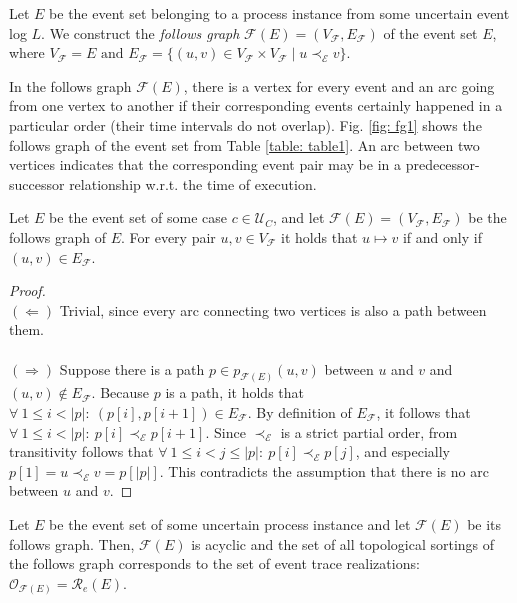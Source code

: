 \begin{definition}\label{def: follows graph}
Let $E$ be the event set belonging to a process instance from some uncertain event log $L$.
We construct the \emph{follows graph} $\mathcal{F}(E)=(V_{\mathcal{F}},E_{\mathcal{F}})$ of the event set $E$, where 
$V_{\mathcal{F}} = E \text{ and }
E_{\mathcal{F}} = \{(u,v) \in V_{\mathcal{F}} \times V_{\mathcal{F}} \mid 
u \prec_{\mathcal{E}} v \}.$
\end{definition}

In the follows graph $\mathcal{F}(E)$, there is a vertex for every event and an arc going from one vertex to another if their corresponding events certainly happened in a particular order (their time intervals do not overlap).
Fig. \ref{fig: fg1} shows the follows graph of the event set from Table \ref{table: table1}.
An arc between two vertices indicates that the corresponding event pair may be in a predecessor-successor relationship w.r.t. the time of execution.

\begin{lemma}\label{lemma: edge path}
Let $E$ be the event set of some case $c \in \mathcal{U}_C$, and let $\mathcal{F}(E)=(V_{\mathcal{F}},E_{\mathcal{F}})$ be the follows graph of $E$.
For every pair $u,v \in V_{\mathcal{F}}$ it holds that $u \mapsto v$ if and only if $(u,v) \in E_{\mathcal{F}}$.
\end{lemma}

\begin{proof} 
\leavevmode \\ 
$(\Leftarrow)$ Trivial, since every arc connecting two vertices is also a path between them. \\ \\
$(\Rightarrow)$ Suppose there is a path $p \in p_{\mathcal{F}(E)}(u,v)$ between $u$ and $v$ and $(u,v) \not \in E_{\mathcal{F}}$.
Because $p$ is a path, it holds that 
$\forall ~ 1 \leq i < |p|: ~ (p[i],p[i+1]) \in E_{\mathcal{F}}$.
By definition of $E_{\mathcal{F}}$, it follows that 
$\forall ~ 1 \leq i < |p|: ~ p[i] \prec_{\mathcal{E}} p[i+1]$.
Since $\prec_{\mathcal{E}}$ is a strict partial order, from transitivity follows that $\forall ~ 1 \leq i < j \leq |p|: ~ p[i] \prec_{\mathcal{E}} p[j]$, and especially $p[1]=u \prec_{\mathcal{E}} v=p[|p|]$.
This contradicts the assumption that there is no arc between $u$ and $v$.
\end{proof}
\pagebreak

\begin{theorem}\label{theorem: topological sortings}
Let $E$ be the event set of some uncertain process instance and let $\mathcal{F}(E)$ be its follows graph.
Then, $\mathcal{F}(E)$ is acyclic and the set of all topological sortings of the follows graph corresponds to the set of event trace realizations: $\mathcal{O}_{\mathcal{F}(E)} = \mathcal{R}_e(E)$.
\end{theorem}

